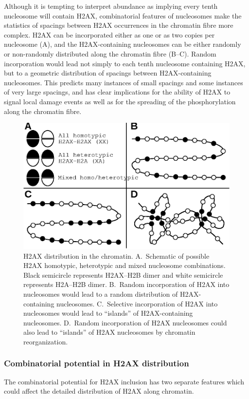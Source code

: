 Although it is tempting to interpret  abundance as implying every tenth nucleosome will contain
H2AX, combinatorial features of nucleosomes make the statistics of spacings between H2AX occurrences
in the chromatin fibre more complex. H2AX can be incorporated either as one or as two copies per
nucleosome (A), and the H2AX-containing nucleosomes can be either
randomly or non-randomly distributed along the chromatin fibre (B--C).
Random incorporation would lead not simply to each tenth nucleosome containing H2AX, but to a
geometric distribution of spacings between H2AX-containing nucleosomes. This predicts many instances
of small spacings and some instances of very large spacings, and has clear implications for the
ability of \textgamma H2AX to signal local damage events as well as for the spreading of the
phosphorylation along the chromatin fibre.

\begin{figure}
\includegraphics{h2ax-review/figs/Fig6}
\caption{H2AX distribution in the chromatin. A.~Schematic of possible H2AX homotypic, heterotypic and
mixed nucleosome combinations. Black semicircle represents H2AX--H2B dimer and white semicircle
represents H2A--H2B dimer. B.~Random incorporation of H2AX into nucleosomes would lead to a random
distribution of H2AX-containing nucleosomes. C.~Selective incorporation of H2AX into nucleosomes
would lead to ``islands'' of H2AX-containing nucleosomes. D.~Random incorporation of H2AX nucleosomes
could also lead to ``islands'' of H2AX nucleosomes by chromatin reorganization.}
\label{fig:h2ax-review:H2AX-distribution}
\end{figure}

\subsubsection{Combinatorial potential in H2AX distribution}
The combinatorial potential for H2AX inclusion has two separate features which could affect the
detailed distribution of H2AX along chromatin.

